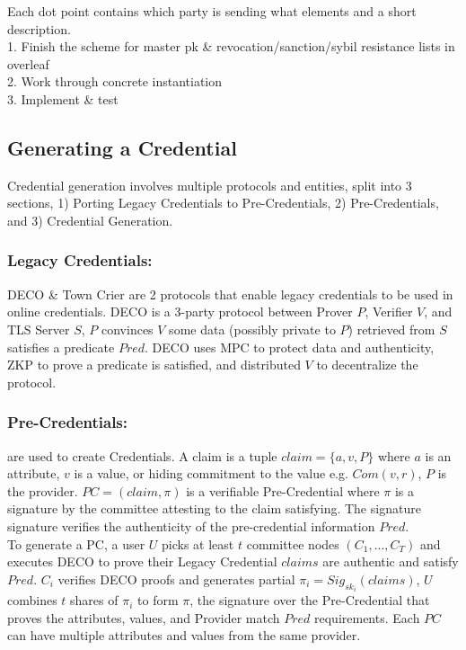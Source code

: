 Each dot point contains which party is sending what elements and a short description. \\
1. Finish the scheme for master pk \& revocation/sanction/sybil resistance lists in overleaf \\
2. Work through concrete instantiation \\
3. Implement \& test
\subsection{Generating a Credential}
Credential generation involves multiple protocols and entities, split into 3 sections, 1) Porting Legacy Credentials to Pre-Credentials, 2) Pre-Credentials, and 3) Credential Generation.

\subsubsection{Legacy Credentials:} DECO \& Town Crier are 2 protocols that enable legacy credentials to be used in online credentials. DECO is a 3-party protocol between Prover $P$, Verifier $V$, and TLS Server $S$, $P$ convinces $V$ some data (possibly private to $P$) retrieved from $S$ satisfies a predicate $Pred$. DECO uses MPC to protect data and authenticity, ZKP to prove a predicate is satisfied, and distributed $V$ to decentralize the protocol.

\subsubsection{Pre-Credentials:} are used to create Credentials. A claim is a tuple $claim = \{a,v,P\}$ where $a$ is an attribute, $v$ is a value, or hiding commitment to the value e.g. $Com(v,r)$, $P$ is the provider. $PC = (claim, \pi)$ is a verifiable Pre-Credential where $\pi$ is a signature by the committee attesting to the claim satisfying. The signature signature verifies the authenticity of the pre-credential information $Pred$.\\

To generate a PC, a user $U$ picks at least $t$ committee nodes $(C_1,...,C_T)$ and executes DECO to prove their Legacy Credential $claims$ are authentic and satisfy $Pred$. $C_i$ verifies DECO proofs and generates partial $\pi_i = Sig_{sk_i}(claims)$, $U$ combines $t$ shares of $\pi_i$ to form $\pi$, the signature over the Pre-Credential that proves the attributes, values, and Provider match $Pred$ requirements. Each $PC$ can have multiple attributes and values from the same provider. \\

